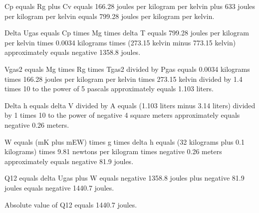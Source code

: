 Cp equals Rg plus Cv equals 166.28 joules per kilogram per kelvin plus 633 joules per kilogram per kelvin equals 799.28 joules per kilogram per kelvin.  

Delta Ugas equals Cp times Mg times delta T equals 799.28 joules per kilogram per kelvin times 0.0034 kilograms times (273.15 kelvin minus 773.15 kelvin) approximately equals negative 1358.8 joules.  

Vgas2 equals Mg times Rg times Tgas2 divided by Pgas equals 0.0034 kilograms times 166.28 joules per kilogram per kelvin times 273.15 kelvin divided by 1.4 times 10 to the power of 5 pascals approximately equals 1.103 liters.  

Delta h equals delta V divided by A equals (1.103 liters minus 3.14 liters) divided by 1 times 10 to the power of negative 4 square meters approximately equals negative 0.26 meters.  

W equals (mK plus mEW) times g times delta h equals (32 kilograms plus 0.1 kilograms) times 9.81 newtons per kilogram times negative 0.26 meters approximately equals negative 81.9 joules.  

Q12 equals delta Ugas plus W equals negative 1358.8 joules plus negative 81.9 joules equals negative 1440.7 joules.  

Absolute value of Q12 equals 1440.7 joules.